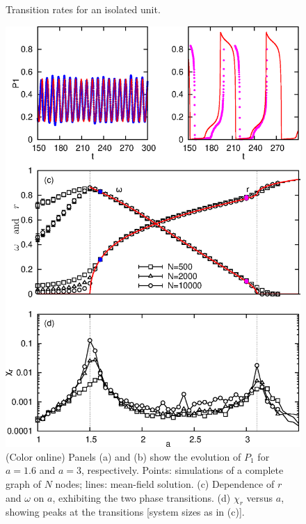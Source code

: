 \begin{figure}[!b]
\begin{center}
\caption{\label{fig:taxas}
    Transition rates for an isolated unit.
    }
\end{center}
\end{figure}

\begin{figure}
    \includegraphics[height=.75\textheight]{fig/figure2.eps}
\begin{center}
\caption{\label{complete_graph} (Color online) Panels (a) and (b) show the evolution of $P_1$ for $a=1.6$ and $a=3$, respectively.
Points: simulations of a complete graph of $N$ nodes; lines: mean-field solution. (c) Dependence of $r$ and $\omega$ on $a$, exhibiting
the two phase transitions. (d) $\chi_r$ versus $a$, showing peaks at the transitions [system sizes as in (c)].  }
\end{center}
\end{figure}

